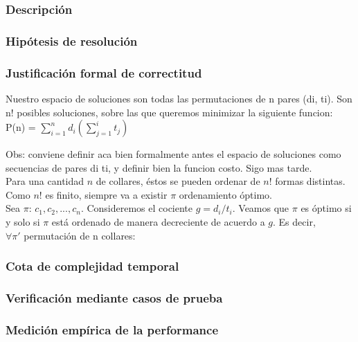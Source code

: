 \documentclass[11pt, a4paper, twoside]{article}
\begin{document}
{}

\subsubsection{Descripción}

\subsubsection{Hipótesis de resolución}

\subsubsection{Justificación formal de correctitud}
Nuestro espacio de soluciones son todas las permutaciones de n pares (di, ti). Son n! posibles soluciones, sobre las que queremos minimizar la siguiente funcion:
P(n) = $\sum\limits_{i=1}^n d_i (\sum\limits_{j=1}^i t_j) $

Obs: conviene definir aca bien formalmente antes el espacio de soluciones como secuencias de pares di ti, y definir bien la funcion costo. Sigo mas tarde.\\
	Para una cantidad $n$ de collares, \'estos se pueden ordenar de $n!$ formas distintas. Como $n!$ es finito, siempre va a existir $\pi$ ordenamiento \'optimo.
\\
	Sea $\pi$: $c_1, c_2, ... , c_n $. Consideremos el cociente $g = d_i / t_i $. Veamos que $\pi$ es \'optimo si y solo si $\pi$ est\'a ordenado de manera decreciente de acuerdo a $g$. Es decir,
	\\$ \forall \pi' $ permutaci\'on de n collares: 

\subsubsection{Cota de complejidad temporal}

\subsubsection{Verificación mediante casos de prueba}

\subsubsection{Medición empírica de la performance}

\end{document}
